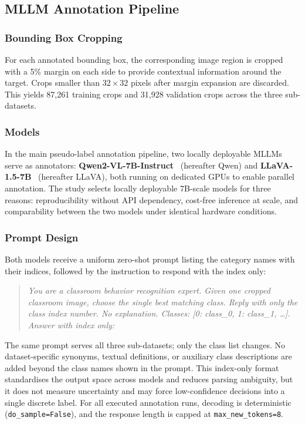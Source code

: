 \documentclass{ieeeaccess}
\begin{document}
\subsection{MLLM Annotation Pipeline}
\label{sec:annotation}

\subsubsection{Bounding Box Cropping}

For each annotated bounding box, the corresponding image region is
cropped with a 5\% margin on each side to provide contextual
information around the target.
Crops smaller than $32 \times 32$ pixels after margin expansion are
discarded.
This yields 87{,}261 training crops and 31{,}928 validation crops
across the three sub-datasets.

\subsubsection{Models}

In the main pseudo-label annotation pipeline, two locally deployable
MLLMs serve as annotators:
\textbf{Qwen2-VL-7B-Instruct}~\cite{bai2023qwen} (hereafter Qwen)
and \textbf{LLaVA-1.5-7B}~\cite{liu2023llava} (hereafter LLaVA),
both running on dedicated GPUs to enable parallel annotation.
The study selects locally deployable 7B-scale models for three reasons:
reproducibility without API dependency, cost-free inference at scale,
and comparability between the two models under identical hardware
conditions.

\subsubsection{Prompt Design}

Both models receive a uniform zero-shot prompt listing the category
names with their indices, followed by the instruction to respond with
the index only:

\begin{quote}
\textit{You are a classroom behavior recognition expert.
Given one cropped classroom image, choose the single best matching
class. Reply with only the class index number. No explanation.
Classes: [0: class\_0, 1: class\_1, \ldots]. Answer with index only:}
\end{quote}

The same prompt serves all three sub-datasets; only the class list
changes.
No dataset-specific synonyms, textual definitions, or auxiliary class
descriptions are added beyond the class names shown in the prompt.
This index-only format standardises the output space across models and
reduces parsing ambiguity, but it does not measure uncertainty and may
force low-confidence decisions into a single discrete label.
For all executed annotation runs, decoding is deterministic
(\texttt{do\_sample=False}), and the response length is capped at
\texttt{max\_new\_tokens=8}.
\end{document}

